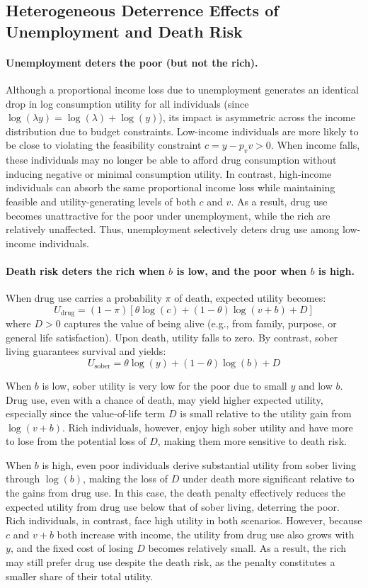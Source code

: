 \documentclass{article}
\begin{document}
\subsection*{Heterogeneous Deterrence Effects of Unemployment and Death Risk}

\paragraph{Unemployment deters the poor (but not the rich).}
Although a proportional income loss due to unemployment generates an identical drop in log consumption utility for all individuals (since $\log(\lambda y) = \log(\lambda) + \log(y)$), its impact is asymmetric across the income distribution due to budget constraints. Low-income individuals are more likely to be close to violating the feasibility constraint $c = y - p_v v > 0$. When income falls, these individuals may no longer be able to afford drug consumption without inducing negative or minimal consumption utility. In contrast, high-income individuals can absorb the same proportional income loss while maintaining feasible and utility-generating levels of both $c$ and $v$. As a result, drug use becomes unattractive for the poor under unemployment, while the rich are relatively unaffected. Thus, unemployment selectively deters drug use among low-income individuals.

\vspace{1em}

\paragraph{Death risk deters the rich when $b$ is low, and the poor when $b$ is high.}
When drug use carries a probability $\pi$ of death, expected utility becomes:
\[
U_{\text{drug}} = (1 - \pi)\left[\theta \log(c) + (1 - \theta)\log(v + b) + D\right]
\]
where $D > 0$ captures the value of being alive (e.g., from family, purpose, or general life satisfaction). Upon death, utility falls to zero. By contrast, sober living guarantees survival and yields:
\[
U_{\text{sober}} = \theta \log(y) + (1 - \theta)\log(b) + D
\]

When $b$ is low, sober utility is very low for the poor due to small $y$ and low $b$. Drug use, even with a chance of death, may yield higher expected utility, especially since the value-of-life term $D$ is small relative to the utility gain from $\log(v + b)$. Rich individuals, however, enjoy high sober utility and have more to lose from the potential loss of $D$, making them more sensitive to death risk.

When $b$ is high, even poor individuals derive substantial utility from sober living through $\log(b)$, making the loss of $D$ under death more significant relative to the gains from drug use. In this case, the death penalty effectively reduces the expected utility from drug use below that of sober living, deterring the poor. Rich individuals, in contrast, face high utility in both scenarios. However, because $c$ and $v + b$ both increase with income, the utility from drug use also grows with $y$, and the fixed cost of losing $D$ becomes relatively small. As a result, the rich may still prefer drug use despite the death risk, as the penalty constitutes a smaller share of their total utility.
\end{document}
